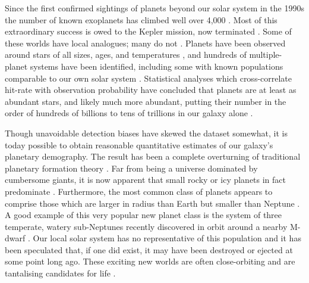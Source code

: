 \documentclass[a4paper,11pt,oneside]{book}
\begin{document}
Since the first confirmed sightings of planets beyond our solar system in the 1990s \citet{Wolszczan1992-cg, Mayor1995-tc} the number of known exoplanets has climbed well over 4,000 \cite{NASA_Exoplanet_Science_Institute2019-lx}. Most of this extraordinary success is owed to the Kepler mission, now terminated \cite{Adams2012-yx}. Some of these worlds have local analogues; many do not \cite{De_Pater2015-sq}. Planets have been observed around stars of all sizes, ages, and temperatures \cite{Burrows2014-nj}, and hundreds of multiple-planet systems have been identified, including some with known populations comparable to our own solar system \citet{Toth2014-ni, Gillon2017-zh}. Statistical analyses which cross-correlate hit-rate with observation probability have concluded that planets are at least as abundant stars, and likely much more abundant, putting their number in the order of hundreds of billions to tens of trillions in our galaxy alone \cite{Cassan2012-jh}.

Though unavoidable detection biases have skewed the dataset somewhat, it is today possible to obtain reasonable quantitative estimates of our galaxy's planetary demography. The result has been a complete overturning of traditional planetary formation theory \cite{Ford2014-gy}. Far from being a universe dominated by cumbersome giants, it is now apparent that small rocky or icy planets in fact predominate \cite{Han2014-bl}. Furthermore, the most common class of planets appears to comprise those which are larger in radius than Earth but smaller than Neptune \cite{Batalha2013-mo}. A good example of this very popular new planet class is the system of three temperate, watery sub-Neptunes recently discovered in orbit around a nearby M-dwarf \cite{Gunther2019-ql}. Our local solar system has no representative of this population and it has been speculated that, if one did exist, it may have been destroyed \cite{Martin2016-gl} or ejected \cite{Cloutier2015-hn} at some point long ago. These exciting new worlds are often close-orbiting and are tantalising candidates for life \cite{Tsiaras2019-ly}.
\end{document}

